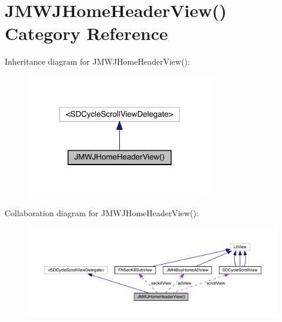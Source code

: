 \hypertarget{category_j_m_w_j_home_header_view_07_08}{}\section{J\+M\+W\+J\+Home\+Header\+View() Category Reference}
\label{category_j_m_w_j_home_header_view_07_08}


Inheritance diagram for J\+M\+W\+J\+Home\+Header\+View()\+:\nopagebreak
\begin{figure}[H]
\begin{center}
\leavevmode
\includegraphics[width=233pt]{category_j_m_w_j_home_header_view_07_08__inherit__graph}
\end{center}
\end{figure}


Collaboration diagram for J\+M\+W\+J\+Home\+Header\+View()\+:\nopagebreak
\begin{figure}[H]
\begin{center}
\leavevmode
\includegraphics[width=350pt]{category_j_m_w_j_home_header_view_07_08__coll__graph}
\end{center}
\end{figure}
